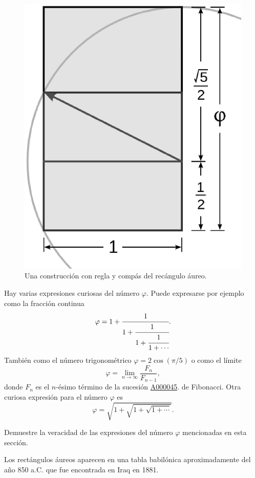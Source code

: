 \begin{figure}
   \centering
   \includegraphics[scale=0.25]{images/construction}
   \caption{Una construcción con regla y compás del recángulo áureo.}
   \label{fig:construction}
\end{figure}

Hay varias expresiones curiosas del número $\varphi$. Puede expresarse por ejemplo como
la fracción continua 
\[
	\varphi=1+\cfrac{1}{1+\cfrac{1}{1+\cfrac{1}{1+\cdots}}}.
\]
También como el número trigonométrico 
$\varphi=2\cos(\pi/5)$ o 
como el límite
\[
	\varphi=\lim_{n\to\infty}\frac{F_n}{F_{n-1}},
\]
donde $F_n$ es el $n$-ésimo término de la sucesión 
\href{https://oeis.org/A000045}{A000045}.
de Fibonacci. 
Otra curiosa expresión para el número $\varphi$ es 
\[
	\varphi=\sqrt{1+\sqrt{1+\sqrt{1+\cdots}}}.
\]


\begin{exercise}
	Demuestre la veracidad de las expresiones del número $\varphi$ mencionadas
	en esta sección. 
\end{exercise}

Los rectángulos áureos aparecen en una tabla babilónica aproximadamente del año
850 a.C. que fue encontrada en Iraq en 1881. 

